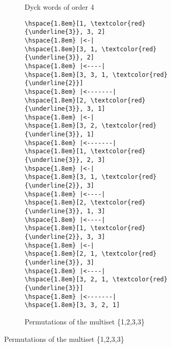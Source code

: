 \begin{figure}
\begin{center}
\begin{subfigure}[]{.40\textwidth}
\begin{center}
\begin{Verbatim}[commandchars=\\\{\}]
\end{Verbatim}
            \end{center}
            \caption{Dyck words of order 4}
            \label{subfig:coolDyck}
        \end{subfigure}
        \begin{subfigure}[]{.24\textwidth}
            \begin{center}
\begin{Verbatim}[commandchars=\\\{\}]
\hspace{1.8em}[1, \textcolor{red}{\underline{3}}, 3, 2]
\hspace{1.8em} |<-|
\hspace{1.8em}[3, 1, \textcolor{red}{\underline{3}}, 2]
\hspace{1.8em} |<----|
\hspace{1.8em}[3, 3, 1, \textcolor{red}{\underline{2}}]
\hspace{1.8em} |<-------|
\hspace{1.8em}[2, \textcolor{red}{\underline{3}}, 3, 1]
\hspace{1.8em} |<-|
\hspace{1.8em}[3, 2, \textcolor{red}{\underline{3}}, 1]
\hspace{1.8em} |<-------|
\hspace{1.8em}[1, \textcolor{red}{\underline{3}}, 2, 3]
\hspace{1.8em} |<-|
\hspace{1.8em}[3, 1, \textcolor{red}{\underline{2}}, 3]
\hspace{1.8em} |<----|
\hspace{1.8em}[2, \textcolor{red}{\underline{3}}, 1, 3]
\hspace{1.8em} |<----|
\hspace{1.8em}[1, \textcolor{red}{\underline{2}}, 3, 3]
\hspace{1.8em} |<-|
\hspace{1.8em}[2, 1, \textcolor{red}{\underline{3}}, 3]
\hspace{1.8em} |<----|
\hspace{1.8em}[3, 2, 1, \textcolor{red}{\underline{3}}]
\hspace{1.8em} |<-------|
\hspace{1.8em}[3, 3, 2, 1]
\end{Verbatim}
            \end{center}
	    \caption{Permutations of the multiset \{1,2,3,3\}}
            \label{fig:lotsofcool}
        \end{subfigure}

\end{center}
\end{figure}

